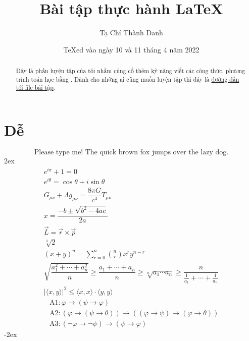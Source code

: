 \documentclass[a4paper,12pt,notitlepage]{article}
\title{Bài tập thực hành \LaTeX}
\author{Tạ Chí Thành Danh}
\date{\TeX ed vào ngày 10 và 11 tháng 4 năm 2022}
\newcommand{\f}[2]{\dfrac{#1}{#2}}
\begin{document}
	\maketitle
	\begin{abstract}
		Đây là phần luyện tập của tôi nhằm củng cố thêm kỹ năng viết các công thức, phương trình toán học bằng \LaTeXe.
		Dành cho những ai cũng muốn luyện tập thì đây là \href{https://web.mit.edu/~jgross/Public/latex/exercises.pdf}{đường dẫn tới file bài tập}.
	\end{abstract}
	\section{Dễ}
	\begin{equation}
		\text{Please type me! The quick brown fox jumps over the lazy dog.}
	\end{equation}
	\openup 2ex
	\begin{gather}
		e^{i \pi} + 1 = 0 \\
		e^{i \theta} = \cos \theta + i \sin \theta \\
		G_{\mu \nu} + \Lambda g_{\mu \nu} = \f{8\pi G}{c^4} T_{\mu \nu} \\
		x = \f{-b \pm \sqrt{b^2 - 4ac}}{2a} \\
		\vec{L} = \vec{r} \times \vec{p} \\
		\sqrt[3]{2} \\
		(x + y)^n = \sum_{r=0}^{n} \binom{n}{r} x^r y^{n-r} \\
		\sqrt{\f{a_1^2 + \cdots + a_n^2}{n}} \geq \f{a_1 + \cdots + a_n}{n} \geq \sqrt[n]{a_1 \cdots a_n} \geq \f{n}{\tfrac{1}{a_1} + \cdots + \tfrac{1}{a_n}} \\
		| \langle x, y \rangle | ^2 \leq \langle x, x \rangle \cdot \langle y, y \rangle %
	\end{gather}
	\begin{align}
	& \mathrm{A}1: \varphi \longrightarrow (\psi \rightarrow \varphi) \nonumber \\
	& \mathrm{A}2: (\varphi \rightarrow (\psi \rightarrow \theta)) \longrightarrow ((\varphi \rightarrow \psi) \rightarrow (\varphi \rightarrow \theta)) \nonumber \\
	& \mathrm{A}3: (\neg \varphi \rightarrow \neg \psi) \longrightarrow (\psi \rightarrow \varphi) 
	\end{align}
	\openup -2ex
\end{document}
